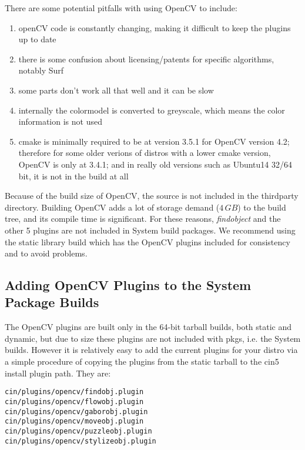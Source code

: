 There are some potential pitfalls with using OpenCV to include:

\begin{enumerate}
    \item openCV code is constantly changing, making it difficult to keep the plugins up to date
    \item there is some confusion about licensing/patents for specific algorithms, notably Surf
    \item some parts don’t work all that well and it can be slow
    \item internally the colormodel is converted to greyscale, which means the color information
is not used
    \item cmake is minimally required to be at version 3.5.1 for OpenCV version 4.2; therefore
for some older verions of distros with a lower cmake version, OpenCV is only at 3.4.1; and in
really old versions such as Ubuntu14 32/64 bit, it is not in the build at all
\end{enumerate}

Because of the build size of OpenCV, the source is not included in the thirdparty directory.
Building OpenCV adds a lot of storage demand ($4\,GB$) to the \CGG{} build tree, and its compile
time is significant. For these reasons, \textit{findobject} and the other 5 plugins are not
included in System build packages.  We recommend using the static library build which has the OpenCV
plugins included for consistency and to avoid problems.

\subsection{Adding OpenCV Plugins to the System Package Builds}%
\label{sub:adding_opencv_to_system_builds}

The OpenCV plugins are built only in the 64-bit tarball builds, both static and dynamic, but due
to size these plugins are not included with pkgs, i.e. the System builds. However it is relatively
easy to add the current plugins for your distro via a simple procedure of copying the plugins
from the static tarball to the cin5 install plugin path. They are:

\begin{lstlisting}[style=sh]
cin/plugins/opencv/findobj.plugin
cin/plugins/opencv/flowobj.plugin
cin/plugins/opencv/gaborobj.plugin
cin/plugins/opencv/moveobj.plugin
cin/plugins/opencv/puzzleobj.plugin
cin/plugins/opencv/stylizeobj.plugin
\end{lstlisting}

